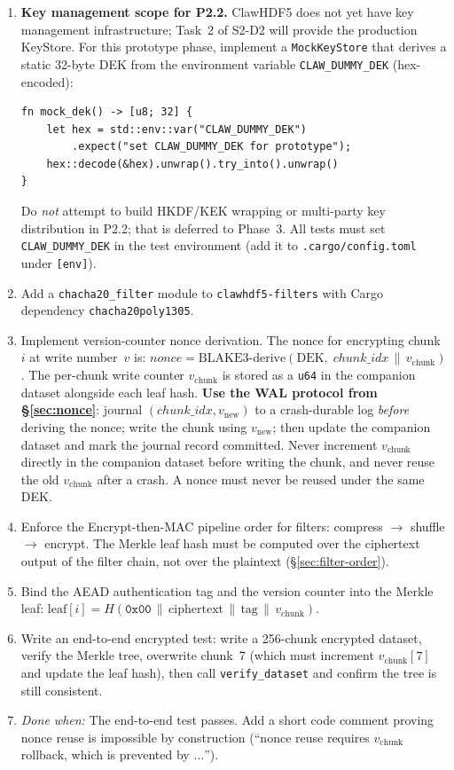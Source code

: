 \documentclass[11pt]{article}
\begin{document}
\begin{enumerate}[nosep]
  \item \textbf{Key management scope for P2.2.}
    ClawHDF5 does not yet have key management infrastructure; Task~2 of
    S2-D2 will provide the production KeyStore. For this prototype phase,
    implement a \texttt{MockKeyStore} that derives a static 32-byte DEK
    from the environment variable \texttt{CLAW\_DUMMY\_DEK} (hex-encoded):
\begin{lstlisting}
fn mock_dek() -> [u8; 32] {
    let hex = std::env::var("CLAW_DUMMY_DEK")
        .expect("set CLAW_DUMMY_DEK for prototype");
    hex::decode(&hex).unwrap().try_into().unwrap()
}
\end{lstlisting}
    Do \emph{not} attempt to build HKDF/KEK wrapping or multi-party key
    distribution in P2.2; that is deferred to Phase~3. All tests must set
    \texttt{CLAW\_DUMMY\_DEK} in the test environment (add it to
    \texttt{.cargo/config.toml} under \texttt{[env]}).
  \item Add a \texttt{chacha20\_filter} module to \texttt{clawhdf5-filters}
    with Cargo dependency \texttt{chacha20poly1305}.
  \item Implement version-counter nonce derivation. The nonce for encrypting
    chunk~$i$ at write number~$v$ is:
    $\mathit{nonce} = \mathrm{BLAKE3\text{-}derive}(\mathrm{DEK},\;
    \mathit{chunk\_idx} \,\|\, v_\mathrm{chunk})$.
    The per-chunk write counter $v_\mathrm{chunk}$ is stored as a
    \texttt{u64} in the companion dataset alongside each leaf hash.
    \textbf{Use the WAL protocol from \S\ref{sec:nonce}}: journal
    $(\mathit{chunk\_idx}, v_\text{new})$ to a crash-durable log
    \emph{before} deriving the nonce; write the chunk using $v_\text{new}$;
    then update the companion dataset and mark the journal record committed.
    Never increment $v_\mathrm{chunk}$ directly in the companion dataset
    before writing the chunk, and never reuse the old $v_\mathrm{chunk}$
    after a crash. A nonce must never be reused under the same DEK.
  \item Enforce the Encrypt-then-MAC pipeline order for filters:
    compress $\to$ shuffle $\to$ encrypt. The Merkle leaf hash must be
    computed over the ciphertext output of the filter chain, not over the
    plaintext (\S\ref{sec:filter-order}).
  \item Bind the AEAD authentication tag and the version counter into the
    Merkle leaf:
    $\mathrm{leaf}[i] = H\!\left(\texttt{0x00} \,\|\,
    \mathrm{ciphertext} \,\|\, \mathrm{tag} \,\|\, v_\mathrm{chunk}\right)$.
  \item Write an end-to-end encrypted test: write a 256-chunk encrypted
    dataset, verify the Merkle tree, overwrite chunk~7 (which must increment
    $v_\mathrm{chunk}[7]$ and update the leaf hash), then call
    \texttt{verify\_dataset} and confirm the tree is still consistent.
  \item \emph{Done when:} The end-to-end test passes. Add a short code
    comment proving nonce reuse is impossible by construction (``nonce
    reuse requires $v_\mathrm{chunk}$ rollback, which is prevented by
    $\ldots$'').
\end{enumerate}
\end{document}
